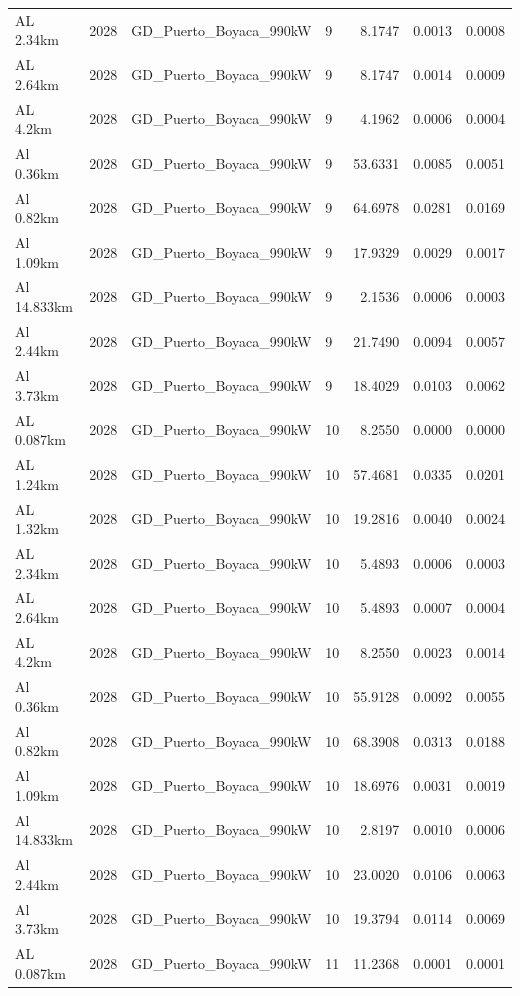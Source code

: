 \documentclass[11pt,a4paper]{article}
\begin{document}
\begin{longtable}{llllrrr}
AL 2.34km & 2028 & GD\_Puerto\_Boyaca\_990kW & 9 & 8.1747 & 0.0013 & 0.0008 \\
AL 2.64km & 2028 & GD\_Puerto\_Boyaca\_990kW & 9 & 8.1747 & 0.0014 & 0.0009 \\
AL 4.2km & 2028 & GD\_Puerto\_Boyaca\_990kW & 9 & 4.1962 & 0.0006 & 0.0004 \\
Al 0.36km & 2028 & GD\_Puerto\_Boyaca\_990kW & 9 & 53.6331 & 0.0085 & 0.0051 \\
Al 0.82km & 2028 & GD\_Puerto\_Boyaca\_990kW & 9 & 64.6978 & 0.0281 & 0.0169 \\
Al 1.09km & 2028 & GD\_Puerto\_Boyaca\_990kW & 9 & 17.9329 & 0.0029 & 0.0017 \\
Al 14.833km & 2028 & GD\_Puerto\_Boyaca\_990kW & 9 & 2.1536 & 0.0006 & 0.0003 \\
Al 2.44km & 2028 & GD\_Puerto\_Boyaca\_990kW & 9 & 21.7490 & 0.0094 & 0.0057 \\
Al 3.73km & 2028 & GD\_Puerto\_Boyaca\_990kW & 9 & 18.4029 & 0.0103 & 0.0062 \\
AL 0.087km & 2028 & GD\_Puerto\_Boyaca\_990kW & 10 & 8.2550 & 0.0000 & 0.0000 \\
AL 1.24km & 2028 & GD\_Puerto\_Boyaca\_990kW & 10 & 57.4681 & 0.0335 & 0.0201 \\
AL 1.32km & 2028 & GD\_Puerto\_Boyaca\_990kW & 10 & 19.2816 & 0.0040 & 0.0024 \\
AL 2.34km & 2028 & GD\_Puerto\_Boyaca\_990kW & 10 & 5.4893 & 0.0006 & 0.0003 \\
AL 2.64km & 2028 & GD\_Puerto\_Boyaca\_990kW & 10 & 5.4893 & 0.0007 & 0.0004 \\
AL 4.2km & 2028 & GD\_Puerto\_Boyaca\_990kW & 10 & 8.2550 & 0.0023 & 0.0014 \\
Al 0.36km & 2028 & GD\_Puerto\_Boyaca\_990kW & 10 & 55.9128 & 0.0092 & 0.0055 \\
Al 0.82km & 2028 & GD\_Puerto\_Boyaca\_990kW & 10 & 68.3908 & 0.0313 & 0.0188 \\
Al 1.09km & 2028 & GD\_Puerto\_Boyaca\_990kW & 10 & 18.6976 & 0.0031 & 0.0019 \\
Al 14.833km & 2028 & GD\_Puerto\_Boyaca\_990kW & 10 & 2.8197 & 0.0010 & 0.0006 \\
Al 2.44km & 2028 & GD\_Puerto\_Boyaca\_990kW & 10 & 23.0020 & 0.0106 & 0.0063 \\
Al 3.73km & 2028 & GD\_Puerto\_Boyaca\_990kW & 10 & 19.3794 & 0.0114 & 0.0069 \\
AL 0.087km & 2028 & GD\_Puerto\_Boyaca\_990kW & 11 & 11.2368 & 0.0001 & 0.0001 \\

\end{longtable}
\end{document}
